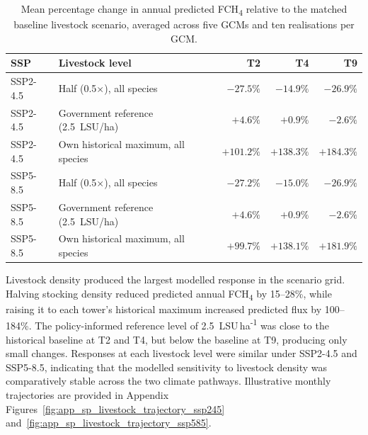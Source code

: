 \begin{table}[h]
\centering
\small
\renewcommand{\arraystretch}{1.1}
\begin{tabular}{llrrr}
\toprule
SSP & Livestock level & T2 & T4 & T9 \\
\midrule
SSP2-4.5 & Half (0.5$\times$), all species & $-27.5\%$ & $-14.9\%$ & $-26.9\%$ \\
SSP2-4.5 & Government reference (2.5~LSU/ha) & $+4.6\%$ & $+0.9\%$ & $-2.6\%$ \\
SSP2-4.5 & Own historical maximum, all species & $+101.2\%$ & $+138.3\%$ & $+184.3\%$ \\
\midrule
SSP5-8.5 & Half (0.5$\times$), all species & $-27.2\%$ & $-15.0\%$ & $-26.9\%$ \\
SSP5-8.5 & Government reference (2.5~LSU/ha) & $+4.6\%$ & $+0.9\%$ & $-2.6\%$ \\
SSP5-8.5 & Own historical maximum, all species & $+99.7\%$ & $+138.1\%$ & $+181.9\%$ \\
\bottomrule
\end{tabular}
\caption{Mean percentage change in annual predicted FCH\textsubscript{4} relative to the matched
baseline livestock scenario, averaged across five GCMs and ten realisations per GCM.}
\label{tab:livestock_scenario_results}
\end{table}

  Livestock density produced the largest modelled response in the scenario grid.
  Halving stocking density reduced predicted annual FCH\textsubscript{4} by
  15--28\%, while raising it to each tower's historical maximum increased
  predicted flux by 100--184\%. The policy-informed reference level of
  2.5~LSU\,ha\textsuperscript{-1} was close to the historical baseline at T2 and
  T4, but below the baseline at T9, producing only small changes. Responses at
  each livestock level were similar under SSP2-4.5 and SSP5-8.5, indicating that
  the modelled sensitivity to livestock density was comparatively stable across
  the two climate pathways. Illustrative monthly trajectories are provided in
  Appendix Figures~\ref{fig:app_sp_livestock_trajectory_ssp245}
  and~\ref{fig:app_sp_livestock_trajectory_ssp585}.


